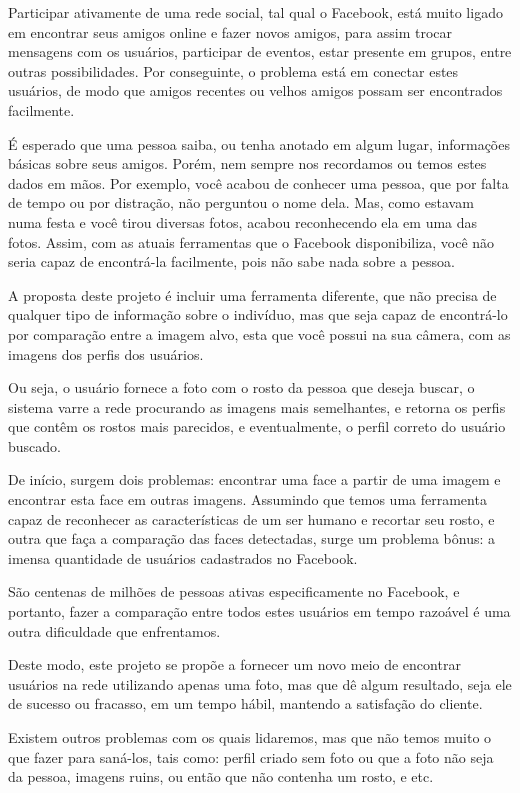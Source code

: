 \documentclass[10pt,a4paper]{article}
\begin{document}
	Participar ativamente de uma rede social, tal qual o Facebook, está muito ligado em encontrar seus amigos online e fazer novos amigos, para assim trocar mensagens com os usuários, participar de eventos, estar presente em grupos, entre outras possibilidades. Por conseguinte, o problema está em conectar estes usuários, de modo que amigos recentes ou velhos amigos possam ser encontrados facilmente.

	É esperado que uma pessoa saiba, ou tenha anotado em algum lugar, informações básicas sobre seus amigos. Porém, nem sempre nos recordamos ou temos estes dados em mãos. Por exemplo, você acabou de conhecer uma pessoa, que por falta de tempo ou por distração, não perguntou o nome dela. Mas, como estavam numa festa e você tirou diversas fotos, acabou reconhecendo ela em uma das fotos. Assim, com as atuais ferramentas que o Facebook disponibiliza, você não seria capaz de encontrá-la facilmente, pois não sabe nada sobre a pessoa.

A proposta deste projeto é incluir uma ferramenta diferente, que não precisa de qualquer tipo de informação sobre o indivíduo, mas que seja capaz de encontrá-lo por comparação entre a imagem alvo, esta que você possui na sua câmera, com as imagens dos perfis dos usuários.

	Ou seja, o usuário fornece a foto com o rosto da pessoa que deseja buscar, o sistema varre a rede procurando as imagens mais semelhantes, e retorna os perfis que contêm os rostos mais parecidos, e eventualmente, o perfil correto do usuário buscado.

	De início, surgem dois problemas: encontrar uma face a partir de uma imagem e encontrar esta face em outras imagens. Assumindo que temos uma ferramenta capaz de reconhecer as características de um ser humano e recortar seu rosto, e outra que faça a comparação das faces detectadas, surge um problema bônus: a imensa quantidade de usuários cadastrados no Facebook.

	São centenas de milhões de pessoas ativas especificamente no Facebook, e portanto, fazer a comparação entre todos estes usuários em tempo razoável é uma outra dificuldade que enfrentamos.

	Deste modo, este projeto se propõe a fornecer um novo meio de encontrar usuários na rede utilizando apenas uma foto, mas que dê algum resultado, seja ele de sucesso ou fracasso, em um tempo hábil, mantendo a satisfação do cliente.

	Existem outros problemas com os quais lidaremos, mas que não
        temos muito o que fazer para saná-los, tais como: perfil
        criado sem foto ou que a foto não seja da pessoa, imagens
        ruins, ou então que não contenha um rosto, e etc.
\end{document}
